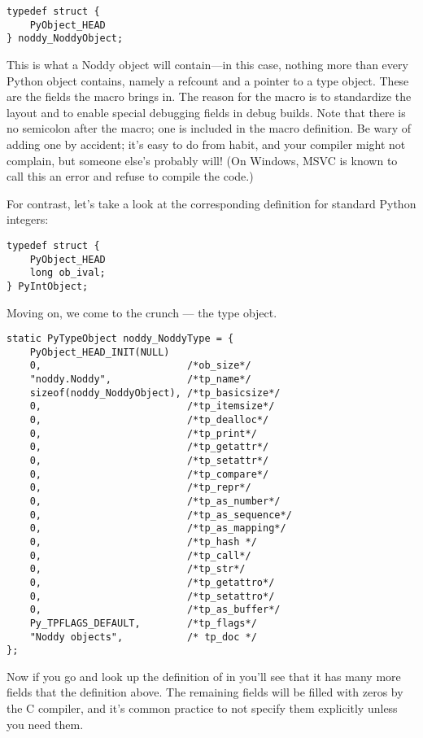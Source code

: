 \begin{verbatim}
typedef struct {
    PyObject_HEAD
} noddy_NoddyObject;
\end{verbatim}

This is what a Noddy object will contain---in this case, nothing more
than every Python object contains, namely a refcount and a pointer to a type
object.  These are the fields the  macro brings
in.  The reason for the macro is to standardize the layout and to
enable special debugging fields in debug builds.  Note that there is
no semicolon after the  macro; one is included in
the macro definition.  Be wary of adding one by accident; it's easy to
do from habit, and your compiler might not complain, but someone
else's probably will!  (On Windows, MSVC is known to call this an
error and refuse to compile the code.)

For contrast, let's take a look at the corresponding definition for
standard Python integers:

\begin{verbatim}
typedef struct {
    PyObject_HEAD
    long ob_ival;
} PyIntObject;
\end{verbatim}

Moving on, we come to the crunch --- the type object.

\begin{verbatim}
static PyTypeObject noddy_NoddyType = {
    PyObject_HEAD_INIT(NULL)
    0,                         /*ob_size*/
    "noddy.Noddy",             /*tp_name*/
    sizeof(noddy_NoddyObject), /*tp_basicsize*/
    0,                         /*tp_itemsize*/
    0,                         /*tp_dealloc*/
    0,                         /*tp_print*/
    0,                         /*tp_getattr*/
    0,                         /*tp_setattr*/
    0,                         /*tp_compare*/
    0,                         /*tp_repr*/
    0,                         /*tp_as_number*/
    0,                         /*tp_as_sequence*/
    0,                         /*tp_as_mapping*/
    0,                         /*tp_hash */
    0,                         /*tp_call*/
    0,                         /*tp_str*/
    0,                         /*tp_getattro*/
    0,                         /*tp_setattro*/
    0,                         /*tp_as_buffer*/
    Py_TPFLAGS_DEFAULT,        /*tp_flags*/
    "Noddy objects",           /* tp_doc */
};
\end{verbatim}

Now if you go and look up the definition of  in
 you'll see that it has many more fields that the
definition above.  The remaining fields will be filled with zeros by
the C compiler, and it's common practice to not specify them
explicitly unless you need them.  


